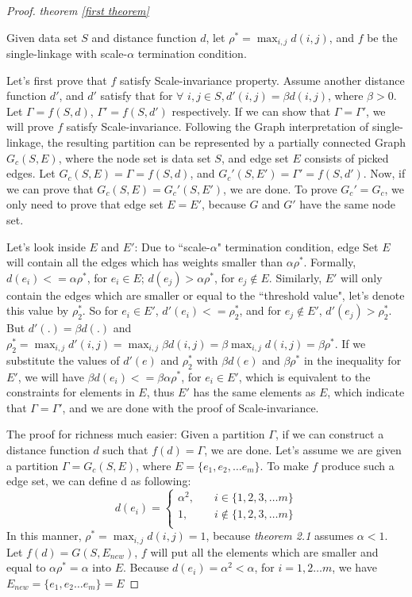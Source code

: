 \documentclass{uonmathreport}
\begin{document}
\begin{proof}
\textit{theorem \ref{first theorem}}

\noindent Given data set $S$ and distance function $d$, let $\rho^* = \max_{i,j}d(i,j)$, and $f$ be the single-linkage with scale-$\alpha$ termination condition. 

Let's first prove that $f$ satisfy Scale-invariance property. Assume another distance function $d'$, and $d'$ satisfy that for $\forall$ $i,j \in S, d'(i,j)=\beta d(i,j)$, where $\beta >0$. Let $\Gamma = f(S,d)$, $\Gamma' = f(S,d')$ respectively. If we can show that $\Gamma = \Gamma'$, we will prove $f$ satisfy Scale-invariance. Following the Graph interpretation of single-linkage, the resulting partition can be represented by a partially connected Graph $G_c(S,E)$, where the node set is data set $S$, and edge set $E$ consists of picked edges. Let $G_c(S,E) = \Gamma = f(S,d)$, and $G_c'(S,E') = \Gamma' = f(S,d')$. Now, if we can prove that $G_c(S,E) = G_c'(S,E')$, we are done. To prove $G_c' = G_c$, we only need to prove that edge set $E=E'$, because $G$ and $G'$ have the same node set.

Let's look inside $E$ and $E'$: Due to ``scale-$\alpha$" termination condition, edge Set $E$ will contain all the edges which has weights smaller than $\alpha\rho^*$. Formally, $d(e_i) <=\alpha\rho^*$, for $e_i\in E$; $d(e_j) > \alpha\rho^*$, for $e_j\notin E$. Similarly, $E'$ will only contain the edges which are smaller or equal to the ``threshold value", let's denote this value by $\rho_{2}^{*}$. So for $e_i \in E'$, $d'(e_i)<=\rho_{2}^{*}$, and for $e_j \notin E'$, $d'(e_j)>\rho_{2}^{*}$. But $d'(.) = \beta d(.)$ and $ \rho_{2}^{*} =  \max_{i,j}d'(i,j)= \max_{i,j}\beta d(i,j)=\beta \max_{i,j} d(i,j) =\beta\rho^*$. If we substitute the values of  $d'(e)$ and $\rho_{2}^{*}$ with $\beta d(e)$ and $\beta \rho^{*}$ in the inequality for $E'$, we will have $\beta d(e_i) <=\beta \alpha\rho^*$, for $e_i \in E'$, which is equivalent to the constraints for elements in $E$, thus $E'$ has the same elements as $E$, which indicate that $\Gamma = \Gamma'$, and we are done with the proof of Scale-invariance.

The proof for richness much easier: Given a partition $\Gamma$, if we can construct a distance function $d$ such that $f(d) = \Gamma$, we are done. Let's assume we are given a partition $\Gamma = G_c(S,E)$, where $E = \{e_1,e_2,\ldots e_m\}$. To make $f$ produce such a edge set, we can define d as following: \[   
d(e_i) = 
     \begin{cases}
       \alpha^2, &\quad i\in\{1,2,3,\ldots m\} \\
       1, &\quad i\notin\{1,2,3,\ldots m\} \\
     \end{cases}
\]
In this manner, $\rho^{*} = \max_{i,j}d(i,j) = 1$, because \textit{theorem 2.1} assumes $\alpha<1$. Let $f(d) = G(S,E_{new})$, $f$ will put all the elements which are smaller and equal to $\alpha \rho^{*} = \alpha$ into $E$. Because $d(e_i)= \alpha^2 < \alpha$, for $i = 1,2\ldots m$, we have $E_{new} = \{e_1,e_2\ldots e_m\}=E$ 
\end{proof}
\end{document}
